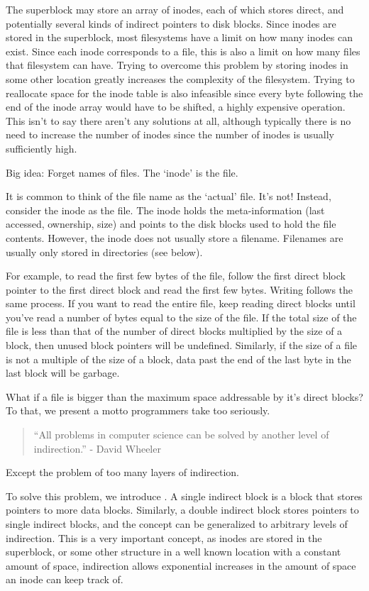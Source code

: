The superblock may store an array of inodes, each of which stores direct, and potentially several kinds of indirect pointers to disk blocks.
Since inodes are stored in the superblock, most filesystems have a limit on how many inodes can exist.
Since each inode corresponds to a file, this is also a limit on how many files that filesystem can have.
Trying to overcome this problem by storing inodes in some other location greatly increases the complexity of the filesystem.
Trying to reallocate space for the inode table is also infeasible since every byte following the end of the inode array would have to be shifted, a highly expensive operation.
This isn't to say there aren't any solutions at all, although typically there is no need to increase the number of inodes since the number of inodes is usually sufficiently high.

Big idea: Forget names of files.
The `inode' is the file.

It is common to think of the file name as the `actual' file.
It's not!
Instead, consider the inode as the file.
The inode holds the meta-information (last accessed, ownership, size) and points to the disk blocks used to hold the file contents.
However, the inode does not usually store a filename.
Filenames are usually only stored in directories (see below).

For example, to read the first few bytes of the file, follow the first direct block pointer to the first direct block and read the first few bytes.
Writing follows the same process.
If you want to read the entire file, keep reading direct blocks until you've read a number of bytes equal to the size of the file.
If the total size of the file is less than that of the number of direct blocks multiplied by the size of a block, then unused block pointers will be undefined.
Similarly, if the size of a file is not a multiple of the size of a block, data past the end of the last byte in the last block will be garbage.

What if a file is bigger than the maximum space addressable by it's direct blocks?
To that, we present a motto programmers take too seriously.

\begin{quote}
``All problems in computer science can be solved by another level of indirection.'' - David Wheeler
\end{quote}

Except the problem of too many layers of indirection.

To solve this problem, we introduce .
A single indirect block is a block that stores pointers to more data blocks.
Similarly, a double indirect block stores pointers to single indirect blocks, and the concept can be generalized to arbitrary levels of indirection.
This is a very important concept, as inodes are stored in the superblock, or some other structure in a well known location with a constant amount of space, indirection allows exponential increases in the amount of space an inode can keep track of.

